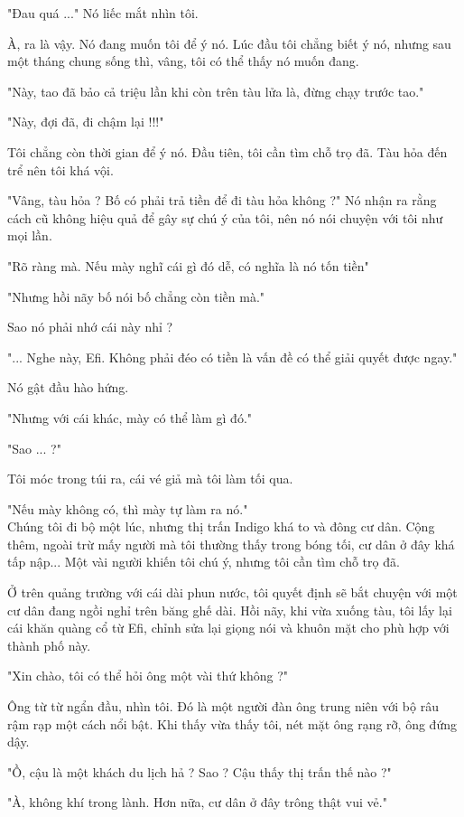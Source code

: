 "Đau quá ..." Nó liếc mắt nhìn tôi.

À, ra là vậy. Nó đang muốn tôi để ý nó. Lúc đầu tôi chẳng biết ý nó, nhưng sau một tháng chung sống thì, vâng, tôi có thể thấy nó muốn đang.

"Này, tao đã bảo cả triệu lần khi còn trên tàu lửa là, đừng chạy trước tao."

"Này, đợi đã, đi chậm lại !!!"

Tôi chẳng còn thời gian để ý nó. Đầu tiên, tôi cần tìm chỗ trọ đã. Tàu hỏa đến trể nên tôi khá vội.

"Vâng, tàu hỏa  ? Bố có phải trả tiền để đi tàu hỏa không ?" Nó nhận ra rằng cách cũ không hiệu quả để gây sự chú ý của tôi, nên nó nói chuyện với tôi như mọi lần.

"Rõ ràng mà. Nếu mày nghĩ cái gì đó dễ, có nghĩa là nó tốn tiền"

"Nhưng hồi nãy bố nói bố chẳng còn tiền mà."

Sao nó phải nhớ cái này nhỉ ?

"... Nghe này, Efi. Không phải đéo có tiền là vấn đề có thể giải quyết được ngay."

Nó gật đầu hào hứng.

"Nhưng với cái khác, mày có thể làm gì đó."

"Sao ... ?"

Tôi móc trong túi ra, cái vé giả mà tôi làm tối qua.

"Nếu mày không có, thì mày tự làm ra nó."\\

Chúng tôi đi bộ một lúc, nhưng thị trấn Indigo khá to và đông cư dân. Cộng thêm, ngoài trừ mấy người mà tôi thường thấy trong bóng tối, cư dân ở đây khá tấp nập... Một vài người khiến tôi chú ý, nhưng tôi cần tìm chỗ trọ đã.

Ở trên quảng trường với cái dài phun nước, tôi quyết định sẽ bắt chuyện với một cư dân đang ngồi nghỉ trên băng ghế dài. Hồi nãy, khi vừa xuống tàu, tôi lấy lại cái khăn quàng cổ từ Efi, chỉnh sửa lại giọng nói và khuôn mặt cho phù hợp với thành phố này. 

"Xin chào, tôi có thể hỏi ông một vài thứ không ?"

Ông từ từ ngẩn đầu, nhìn tôi. Đó là một người đàn ông trung niên với bộ râu rậm rạp một cách nổi bật. Khi thấy vừa thấy tôi, nét mặt ông rạng rỡ, ông đứng dậy.

"Ồ, cậu là một khách du lịch hả ? Sao ? Cậu thấy thị trấn thế nào ?"

"À, không khí trong lành. Hơn nữa, cư dân ở đây trông thật vui vẻ."
   
